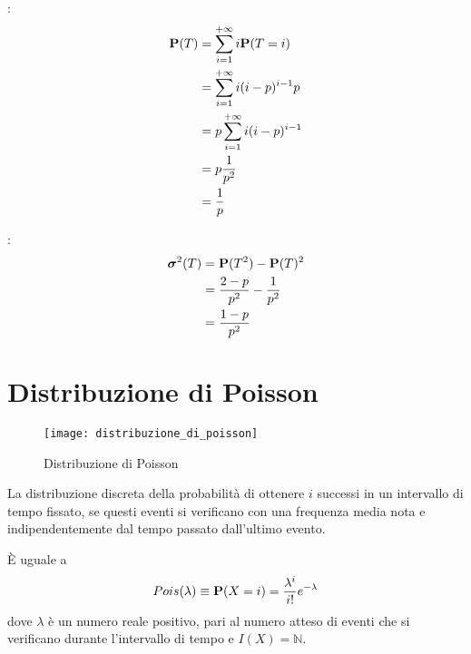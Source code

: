 :
\begin{align*}
  \mathbf{P}(T) &= \sum_{i=1}^{+ \infty} i \mathbf{P}(T = i) \\
  &= \sum_{i=1}^{+ \infty} i (i - p)^{i-1} p \\
  &= p \sum_{i=1}^{+ \infty} i (i - p)^{i-1} \\
  &= p \frac{1}{p^2} \\
  &= \frac{1}{p}
\end{align*}

:
\begin{align*}
  \boldsymbol\sigma^2(T) &= \mathbf{P}(T^2) - \mathbf{P}(T)^2 \\
  &= \frac{2-p}{p^2} - \frac{1}{p^2} \\
  &= \frac{1-p}{p^2}
\end{align*}


\section{Distribuzione di Poisson} %
\begin{figure*}
  \texttt{[image: distribuzione\_di\_poisson]}
  \caption{Distribuzione di Poisson}
\end{figure*}

\begin{definition}
  \label{def:distribuzione_di_poisson}
  La distribuzione discreta della probabilità di ottenere \( i \) successi in un intervallo di tempo fissato,
  se questi eventi si verificano con una frequenza media nota e indipendentemente dal tempo passato dall'ultimo evento.

  È uguale a
  \[ Pois(\lambda) \equiv \mathbf{P}(X = i) = \frac{\lambda^i}{i!} e^{- \lambda} \]
  dove \( \lambda \) è un numero reale positivo, pari al numero atteso di eventi che si verificano durante l'intervallo di tempo e \( I(X) = \mathbb{N} \).
\end{definition}

